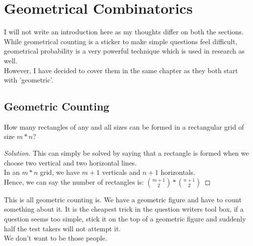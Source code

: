 \chapter{Geometrical Combinatorics}
I will not write an introduction here as my thoughts differ on both the sections.\\
While geometrical counting is a sticker to make simple questions feel difficult, geometrical probability is a very powerful technique which is used in research as well.\\
However, I have decided to cover them in the same chapter as they both start with 'geometric'.\\
\section{Geometric Counting}
\begin{example}
    How many rectangles of any and all sizes can be formed in a rectangular grid of size $m*n$?
\end{example}
\begin{proof}
    [Solution]
    This can simply be solved by saying that a rectangle is formed when we choose two vertical and two horizontal lines.\\
    In an $m*n$ grid, we have $m+1$ verticals and $n+1$ horizontals. \\
    Hence, we can say the number of rectangles is: $\binom{m+1}{2}*\binom{n+1}{2}$
\end{proof}
This is all geometric counting is. We have a geometric figure and have to count something about it. It is the cheapest trick in the question writers tool box, if a question seems too simple, stick it on the top of a geometric figure and suddenly half the test takers will not attempt it.\\
We don't want to be those people.\\
